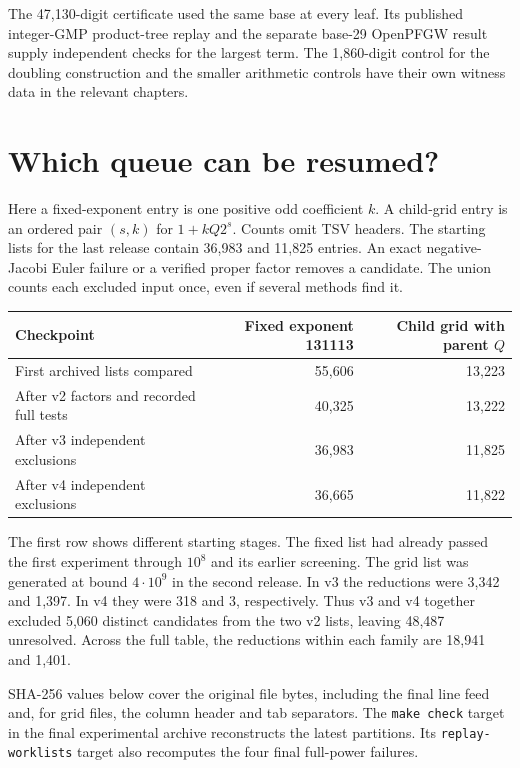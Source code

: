 \documentclass[11pt,a4paper,oneside,openany]{report}
\begin{document}
The 47,130-digit certificate used the same base at every leaf. Its
published integer-GMP product-tree replay and the separate base-29
OpenPFGW result supply independent checks for the largest term. The
1,860-digit control for the doubling construction and the smaller
arithmetic controls have their own witness data in the relevant chapters.

\section{Which queue can be resumed?}
Here a fixed-exponent entry is one positive odd coefficient $k$. A child-grid
entry is an ordered pair $(s,k)$ for $1+kQ2^s$. Counts omit TSV headers.
The starting lists for the last release contain 36,983 and 11,825
entries. An exact negative-Jacobi Euler failure or a verified proper
factor removes a candidate. The union counts each excluded input once,
even if several methods find it.

\begin{center}\small
\begin{tabular}{@{}lrr@{}}\toprule
Checkpoint & Fixed exponent 131113 & Child grid with parent $Q$\\\midrule
First archived lists compared &55,606&13,223\\
After v2 factors and recorded full tests &40,325&13,222\\
After v3 independent exclusions &36,983&11,825\\
After v4 independent exclusions &36,665&11,822\\
\bottomrule\end{tabular}
\end{center}

The first row shows different starting stages. The fixed list had already
passed the first experiment through $10^8$ and its earlier screening.
The grid list was generated at bound $4\cdot10^9$ in the second release.
In v3 the reductions were 3,342 and 1,397. In v4 they were 318 and 3,
respectively. Thus v3 and v4 together excluded 5,060 distinct candidates
from the two v2 lists, leaving 48,487 unresolved. Across the full table,
the reductions within each family are 18,941 and 1,401.

SHA-256 values below cover the original file bytes, including the final
line feed and, for grid files, the column header and tab separators.
The \texttt{make check} target in the final experimental archive reconstructs
the latest partitions. Its \texttt{replay-worklists} target also recomputes
the four final full-power failures.
\end{document}
